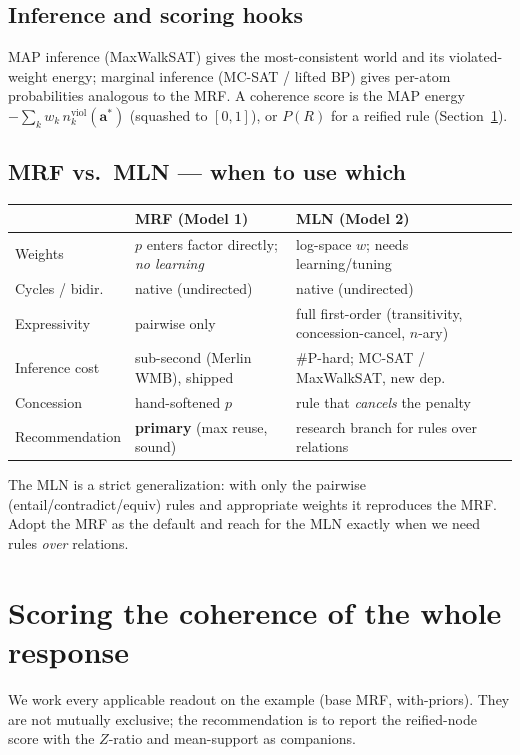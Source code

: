 \documentclass[11pt]{article}
\begin{document}
\subsection{Inference and scoring hooks}
MAP inference (MaxWalkSAT) gives the most-consistent world and its violated-weight energy;
marginal inference (MC-SAT / lifted BP) gives per-atom probabilities analogous to the MRF.
A coherence score is the MAP energy $-\sum_k w_k\,n_k^{\text{viol}}(\mathbf a^*)$ (squashed
to $[0,1]$), or $P(R)$ for a reified rule (Section~\ref{sec:scoring}).

\subsection{MRF vs.\ MLN --- when to use which}
\begin{center}\small
\begin{tabular}{@{}p{3.2cm}p{5.4cm}p{5.4cm}@{}}
\toprule
 & \textbf{MRF (Model 1)} & \textbf{MLN (Model 2)}\\
\midrule
Weights          & $p$ enters factor directly; \emph{no learning} & log-space $w$; needs learning/tuning\\
Cycles / bidir.  & native (undirected) & native (undirected)\\
Expressivity     & pairwise only & full first-order (transitivity, concession-cancel, $n$-ary)\\
Inference cost   & sub-second (Merlin WMB), shipped & \#P-hard; MC-SAT / MaxWalkSAT, new dep.\\
Concession       & hand-softened $p$ & rule that \emph{cancels} the penalty\\
Recommendation   & \textbf{primary} (max reuse, sound) & research branch for rules over relations\\
\bottomrule
\end{tabular}
\end{center}
The MLN is a strict generalization: with only the pairwise (entail/contradict/equiv) rules
and appropriate weights it reproduces the MRF. Adopt the MRF as the default and reach for
the MLN exactly when we need rules \emph{over} relations.

\section{Scoring the coherence of the whole response}
\label{sec:scoring}

We work every applicable readout on the example (base MRF, with-priors). They are not
mutually exclusive; the recommendation is to report the reified-node score with the
$Z$-ratio and mean-support as companions.
\end{document}

